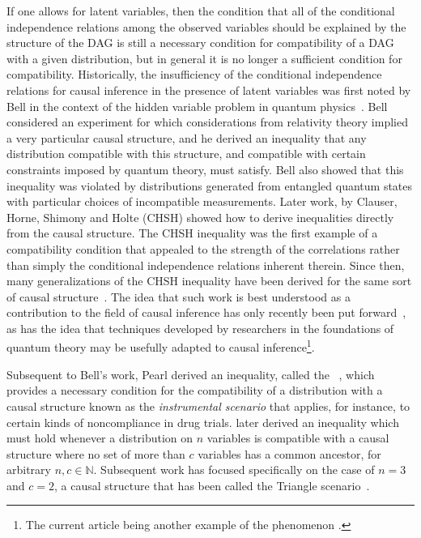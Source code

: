 If one allows for latent variables, then the condition that all of the conditional independence relations among the observed variables should be explained by the structure of the DAG is still a necessary condition for compatibility of a DAG with a given distribution, but in general it is no longer a sufficient condition for compatibility. Historically, the insufficiency of the conditional independence relations for causal inference in the presence of latent variables was first noted by Bell in the context of the hidden variable problem in quantum physics~\cite{bell1964einstein}. Bell considered an experiment for which considerations from relativity theory implied a very particular causal structure, and he derived an inequality that any distribution compatible with this structure, and compatible with certain constraints imposed by quantum theory, must satisfy.  Bell also showed that this inequality was violated by distributions generated from entangled quantum states with particular choices of incompatible measurements.
Later work, by Clauser, Horne, Shimony and Holte (CHSH) \cite{CHSHOriginal} showed how to derive inequalities directly from the causal structure. The CHSH inequality was the first example of a compatibility condition that appealed to the strength of the correlations rather than simply the conditional independence relations inherent therein.  Since then, many generalizations of the CHSH inequality have been derived for the same sort of causal structure~\cite{Brunner2013Bell}. The idea that such work is best understood as a contribution to the field of causal inference has only recently been put forward~\cite{WoodSpekkens,fritz2012bell,pusey2014gdag,BeyondBellII}, as has the idea that techniques developed by researchers in the foundations of quantum theory may be usefully adapted to causal inference\footnote{The current article being another example of the phenomenon \cite{ChavesNoSignalling,chaves2014informationinference,weilenmann2016entropic,kela2016covariance,ChavesPolynomial,TavakoliStarNetworks,RossetNetworks,TavakoliNoncyclicNetworks}.}.

Subsequent to Bell's work, Pearl derived an inequality, called the ~\cite{pearl1995instrumental}, which provides a necessary condition for the compatibility of a distribution with a causal structure 
known as the \emph{instrumental scenario} that applies, for instance, to certain kinds of noncompliance in drug trials. \citet{steudel2010ancestors} later derived an inequality which must hold whenever a distribution on $n$
variables is compatible with a causal structure where no set of more
than $c$ variables has a common ancestor, for arbitrary $n,c \in \mathbb{N}$.  Subsequent work has focused specifically on the case of $n=3$ and $c=2$, a causal structure that has been called the Triangle scenario~\cite{fritz2012bell,chaves2014novel}.

